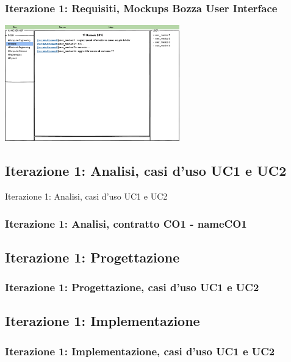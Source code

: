 \documentclass[t]{beamer} %
\begin{document}
\begin{frame}
 \frametitle{Iterazione 1: Requisiti, Mockups Bozza User Interface}
    \includegraphics[height=190px, width=286px,]{image_mockups/09_siuc_user_room_medical.png}{\centering}
\end{frame}

\subsection{Iterazione 1: Analisi, casi d'uso UC1 e UC2}
\begin{frame} {Iterazione 1: Analisi, casi d'uso UC1 e UC2}
\end{frame}

\begin{frame}
 \frametitle{Iterazione 1: Analisi, contratto CO1 - nameCO1}
  \begin{table}[!htbp]
   \caption {Contratto CO1 - nameCO1}
    \label{table:1}
   \end{table}
\end{frame}

\subsection{Iterazione 1: Progettazione}
\begin{frame}
 \frametitle{Iterazione 1: Progettazione, casi d'uso UC1 e UC2}
\end{frame}

\subsection{Iterazione 1: Implementazione}
\begin{frame}
 \frametitle{Iterazione 1: Implementazione, casi d'uso UC1 e UC2}
\end{frame}
\end{document}
